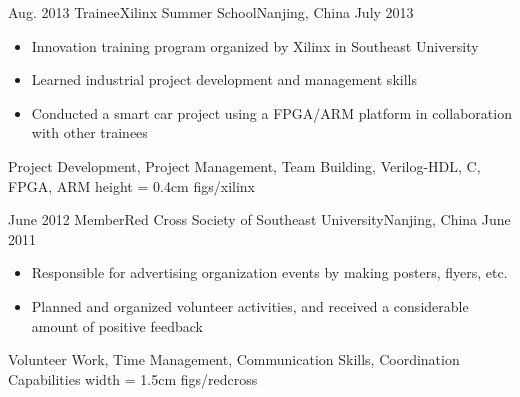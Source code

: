
\begin{experiences}
	\experience
	{Aug. 2013}	{Trainee}{Xilinx Summer School}{Nanjing, China}
	{July 2013}	{
		\begin{itemize}
			\item Innovation training program organized by Xilinx in Southeast University
			\item Learned industrial project development and management skills
			\item Conducted a smart car project using a FPGA/ARM platform in collaboration with other trainees
		\end{itemize}
	}
	{Project Development, Project Management, Team Building, Verilog-HDL, C, FPGA, ARM}
	{height = 0.4cm}		{figs/xilinx}
	\emptySeparator

	\experience
	{June 2012}	{Member}{Red Cross Society of Southeast University}{Nanjing, China}
	{June 2011}	{
		\begin{itemize}
			\item Responsible for advertising organization events by making posters, flyers, etc.
			\item Planned and organized volunteer activities, and received a considerable amount of positive feedback
		\end{itemize}
	}
	{Volunteer Work, Time Management, Communication Skills, Coordination Capabilities}
	{width = 1.5cm}		{figs/redcross}
\end{experiences}
